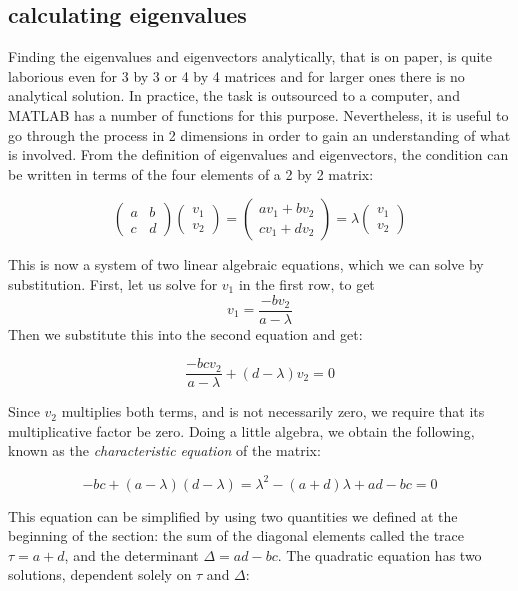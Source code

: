 \documentclass[
  letterpaper,
  DIV=11,
  numbers=noendperiod]{scrreprt}
\begin{document}
\hypertarget{calculating-eigenvalues}{%
\subsection{calculating eigenvalues}\label{calculating-eigenvalues}}

Finding the eigenvalues and eigenvectors analytically, that is on paper,
is quite laborious even for 3 by 3 or 4 by 4 matrices and for larger
ones there is no analytical solution. In practice, the task is
outsourced to a computer, and MATLAB has a number of functions for this
purpose. Nevertheless, it is useful to go through the process in 2
dimensions in order to gain an understanding of what is involved. From
the definition of eigenvalues and eigenvectors, the condition can be
written in terms of the four elements of a 2 by 2 matrix:

\[
\left(\begin{array}{cc}a & b \\c & d\end{array}\right)\left(\begin{array}{c}v_1 \\ v_2 \end{array}\right) = \left(\begin{array}{c}av_1 +b v_2\\ cv_1+ dv_2 \end{array}\right) = \lambda \left(\begin{array}{c}v_1 \\ v_2 \end{array}\right)
\]

This is now a system of two linear algebraic equations, which we can
solve by substitution. First, let us solve for \(v_1\) in the first row,
to get \[v_1 = \frac{-bv_2}{a-\lambda}\] Then we substitute this into
the second equation and get:

\[
\frac{-bcv_2}{a-\lambda} +(d-\lambda)v_2 = 0
\]

Since \(v_2\) multiplies both terms, and is not necessarily zero, we
require that its multiplicative factor be zero. Doing a little algebra,
we obtain the following, known as the \emph{characteristic equation} of
the matrix:

\[
-bc +(a-\lambda)(d-\lambda) = \lambda^2-(a+d)\lambda +ad-bc = 0
\]

This equation can be simplified by using two quantities we defined at
the beginning of the section: the sum of the diagonal elements called
the trace \(\tau = a+d\), and the determinant \(\Delta = ad-bc\). The
quadratic equation has two solutions, dependent solely on \(\tau\) and
\(\Delta\):
\end{document}

